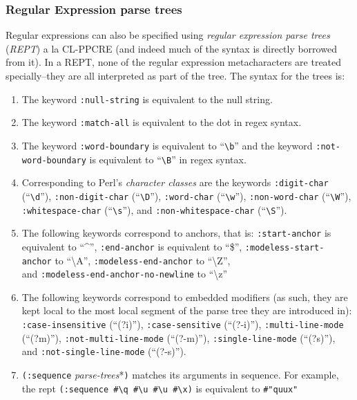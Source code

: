 \documentclass[10pt]{book}
\begin{document}
\subsubsection{Regular Expression parse trees}
Regular expressions can also be specified using \textit{regular expression parse trees} (\textit{REPT}) a la CL-PPCRE\cite{clppcre} (and indeed much of the syntax is directly borrowed from it). In a REPT, none of the regular expression metacharacters are treated specially--they are all interpreted as part of the tree. The syntax for the trees is:\\
\begin{enumerate}
\item The keyword \texttt{:null-string} is equivalent to the null string. 
\item The keyword \texttt{:match-all} is equivalent to the dot in regex syntax.
\item The keyword \texttt{:word-boundary} is equivalent to ``\texttt{\textbackslash b}'' and the keyword \texttt{:not-word-boundary} is equivalent to ``\texttt{\textbackslash B}'' in regex syntax.
\item Corresponding to Perl's \textit{character classes} are the keywords \texttt{:digit-char} (``\texttt{\textbackslash d}''), \texttt{:non-digit-char} (``\texttt{\textbackslash D}''), \texttt{:word-char} (``\texttt{\textbackslash w}''), \texttt{:non-word-char} (``\texttt{\textbackslash W}''), \texttt{:whitespace-char} (``\texttt{\textbackslash s}''), and \texttt{:non-whitespace-char} (``\texttt{\textbackslash S}'').
\item The following keywords correspond to anchors, that is: \texttt{:start-anchor} is equivalent to ``\^{}'', \texttt{:end-anchor} is equivalent to ``\$'', \texttt{:modeless-start-anchor} to ``\textbackslash A'', \texttt{:modeless-end-anchor} to ``\textbackslash Z'',\\ and \texttt{:modeless-end-anchor-no-newline} to ``\textbackslash z''
\item The following keywords correspond to embedded modifiers (as such, they are kept local to the most local segment of the parse tree they are introduced in): \texttt{:case-insensitive} (``(?i)''), \texttt{:case-sensitive} (``(?-i)''), \texttt{:multi-line-mode} (``(?m)''), \texttt{:not-multi-line-mode} (``(?-m)''), \texttt{:single-line-mode} (``(?s)''), and \texttt{:not-single-line-mode} (``(?-s)'').
\item \texttt{(:sequence} \textit{parse-trees}*\texttt{)} matches its arguments in sequence. For example, the rept \texttt{(:sequence \#\textbackslash q \#\textbackslash u \#\textbackslash u \#\textbackslash x)} is equivalent to \texttt{\#"quux"}

\end{enumerate}
\end{document}
